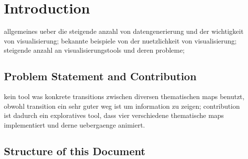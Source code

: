 \section{Introduction}
allgemeines ueber die steigende anzahl von datengenerierung und der wichtigkeit von visualisierung; bekannte beispiele von der nuetzlichkeit von visualisierung; steigende anzahl an visualisierungstools und deren probleme;

\subsection{Problem Statement and Contribution}
kein tool was konkrete transitions zwischen diversen thematischen maps benutzt, obwohl transition ein sehr guter weg ist um information zu zeigen; contribution ist dadurch ein exploratives tool, dass vier verschiedene thematische maps implementiert und derne uebergaenge animiert.

\subsection{Structure of this Document}

